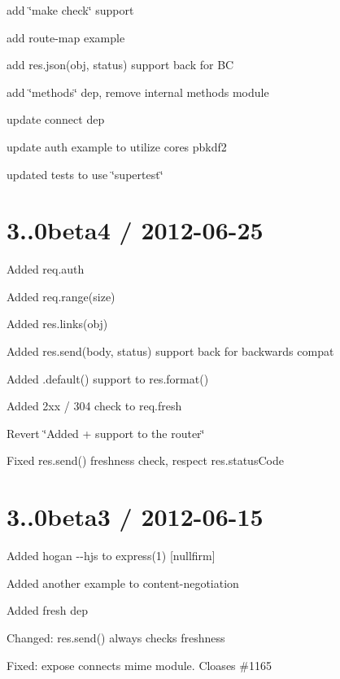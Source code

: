 \begin{DoxyItemize}
\item add \char`\"{}make check\char`\"{} support
\item add route-\/map example
\item add {\ttfamily res.\+json(obj, status)} support back for B\+C
\item add \char`\"{}methods\char`\"{} dep, remove internal methods module
\item update connect dep
\item update auth example to utilize cores pbkdf2
\item updated tests to use \char`\"{}supertest\char`\"{}
\end{DoxyItemize}

\section*{3..\+0beta4 / 2012-\/06-\/25 }


\begin{DoxyItemize}
\item Added {\ttfamily req.\+auth}
\item Added {\ttfamily req.\+range(size)}
\item Added {\ttfamily res.\+links(obj)}
\item Added {\ttfamily res.\+send(body, status)} support back for backwards compat
\item Added {\ttfamily .default()} support to {\ttfamily res.\+format()}
\item Added 2xx / 304 check to {\ttfamily req.\+fresh}
\item Revert \char`\"{}\+Added + support to the router\char`\"{}
\item Fixed {\ttfamily res.\+send()} freshness check, respect res.\+status\+Code
\end{DoxyItemize}

\section*{3..\+0beta3 / 2012-\/06-\/15 }


\begin{DoxyItemize}
\item Added hogan {\ttfamily -\/-\/hjs} to express(1) \mbox{[}nullfirm\mbox{]}
\item Added another example to content-\/negotiation
\item Added {\ttfamily fresh} dep
\item Changed\+: {\ttfamily res.\+send()} always checks freshness
\item Fixed\+: expose connects mime module. Cloases \#1165
\end{DoxyItemize}

